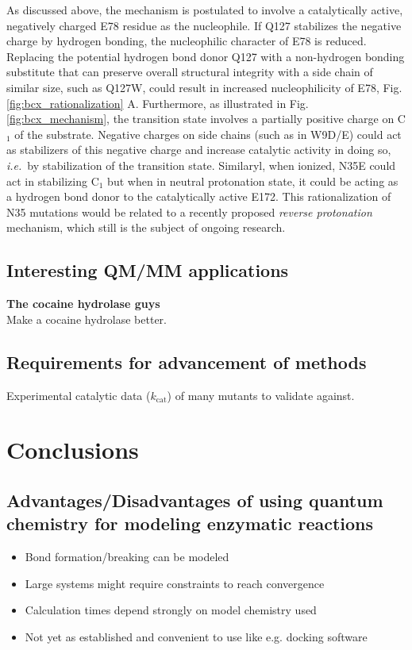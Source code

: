 As discussed above, the mechanism is postulated to involve a catalytically active, negatively charged E78 residue as the nucleophile.
If Q127 stabilizes the negative charge by hydrogen bonding, the nucleophilic character of E78 is reduced.
Replacing the potential hydrogen bond donor Q127 with a non-hydrogen bonding substitute that can preserve overall structural integrity with a side chain of similar size, such as Q127W, could result in increased nucleophilicity of E78, Fig. \ref{fig:bcx_rationalization} A.
Furthermore, as illustrated in Fig. \ref{fig:bcx_mechanism}, the transition state involves a partially positive charge on C$_1$ of the substrate.
Negative charges on side chains (such as in W9D/E) could act as stabilizers of this negative charge and increase catalytic activity in doing so, \textit{i.e.} by stabilization of the transition state.
Similaryl, when ionized, N35E could act in stabilizing C$_1$ but when in neutral protonation state, it could be acting as a hydrogen bond donor to the catalytically active E172.
This rationalization of N35 mutations would be related to a recently proposed \textit{reverse protonation} mechanism\cite{joshi2000hydrogen}, which still is the subject of ongoing research.

\newpage
\subsection{Interesting QM/MM applications}
\textbf{The cocaine hydrolase guys}\\
Make a cocaine hydrolase better\cite{gao2006computational}.

\subsection{Requirements for advancement of methods}
Experimental catalytic data ($k_\text{cat}$) of many mutants to validate against.


\section{Conclusions}\label{sec:conclusions}

\subsection{Advantages/Disadvantages of using quantum chemistry for modeling enzymatic reactions}
\begin{itemize}
\item Bond formation/breaking can be modeled
\item Large systems might require constraints to reach convergence
\item Calculation times depend strongly on model chemistry used
\item Not yet as established and convenient to use like e.g. docking software
\end{itemize}
